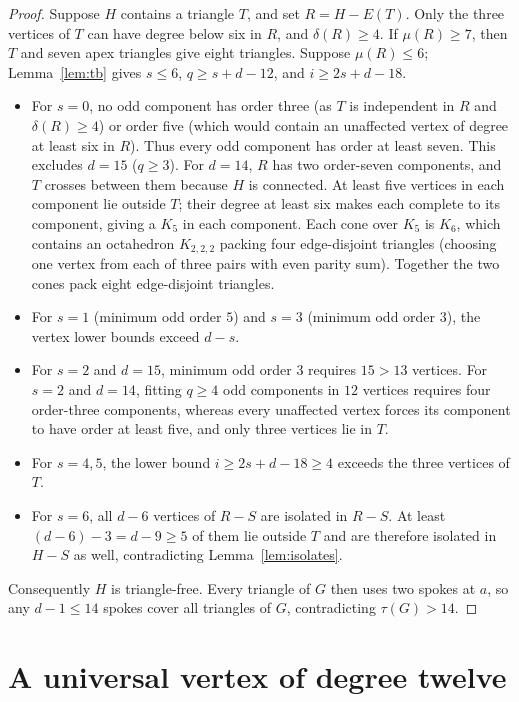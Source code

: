 \documentclass[11pt]{article}
\begin{document}
\begin{proof}
Suppose $H$ contains a triangle $T$, and set $R=H-E(T)$. Only the three vertices of $T$ can have degree below six in $R$, and $\delta(R)\geq 4$. If $\mu(R)\geq 7$, then $T$ and seven apex triangles give eight triangles. Suppose $\mu(R)\leq 6$; Lemma~\ref{lem:tb} gives $s\leq 6$, $q\geq s+d-12$, and $i\geq 2s+d-18$.
\begin{itemize}
\item For $s=0$, no odd component has order three (as $T$ is independent in $R$ and $\delta(R)\geq 4$) or order five (which would contain an unaffected vertex of degree at least six in $R$). Thus every odd component has order at least seven. This excludes $d=15$ ($q\geq 3$). For $d=14$, $R$ has two order-seven components, and $T$ crosses between them because $H$ is connected. At least five vertices in each component lie outside $T$; their degree at least six makes each complete to its component, giving a $K_5$ in each component. Each cone over $K_5$ is $K_6$, which contains an octahedron $K_{2,2,2}$ packing four edge-disjoint triangles (choosing one vertex from each of three pairs with even parity sum). Together the two cones pack eight edge-disjoint triangles.
\item For $s=1$ (minimum odd order $5$) and $s=3$ (minimum odd order $3$), the vertex lower bounds exceed $d-s$.
\item For $s=2$ and $d=15$, minimum odd order $3$ requires $15>13$ vertices. For $s=2$ and $d=14$, fitting $q\geq 4$ odd components in $12$ vertices requires four order-three components, whereas every unaffected vertex forces its component to have order at least five, and only three vertices lie in $T$.
\item For $s=4,5$, the lower bound $i\geq 2s+d-18\geq 4$ exceeds the three vertices of $T$.
\item For $s=6$, all $d-6$ vertices of $R-S$ are isolated in $R-S$. At least $(d-6)-3=d-9\geq 5$ of them lie outside $T$ and are therefore isolated in $H-S$ as well, contradicting Lemma~\ref{lem:isolates}.
\end{itemize}
Consequently $H$ is triangle-free. Every triangle of $G$ then uses two spokes at $a$, so any $d-1\leq 14$ spokes cover all triangles of $G$, contradicting $\tau(G)>14$.
\end{proof}

\section{A universal vertex of degree twelve}
\end{document}
